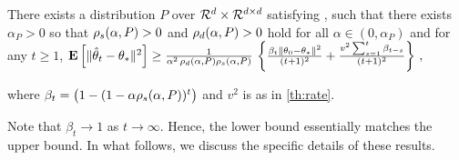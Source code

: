 \begin{theorem}\label{th:lb}
There exists a distribution $P$ over $\mathcal{R}^d\times \mathcal{R}^{d \times d}$ satisfying , such that
there exists $\alpha_P>0$ so that $\rho_s(\alpha,P)>0$ and $\rho_d(\alpha,P)>0$ hold for all $\alpha\in (0,\alpha_P)$ and
for any $t\ge 1$,  $\mathbf{E}\left[\| \hat{\theta}_t-\theta_*\|^2\right] 
\geq \frac{1}{\alpha^2 \, \rho_d(\alpha,P)\rho_s(\alpha,P)} \,\left\{ \frac{\beta_t \left\| \theta_0-\theta_*\right\|^2}{(t+1)^2} 
+ \frac{v^2\sum_{s=1}^t \beta_{t-s}  }{(t+1)^2} \right\}\,,$
\begin{comment}
\begin{align*}
\EE{\normsm{\thh_t-\ts}^2} 
&\geq \frac{1}{\alpha^2 \, \rhod{P}\rhos{P}} \,\left\{ \frac{\beta_t \norm{\theta_0-\ts}^2}{(t+1)^2} 
+ \frac{v^2\sum_{s=1}^t \beta_{t-s}  }{(t+1)^2} \right\}\,,
\end{align*}
\end{comment}
where $\beta_{t} =  \big(1-(1-\alpha \rho_s(\alpha,P))^t\big)$ and $v^2$ is as in \cref{th:rate}.
\begin{comment}
\begin{align}
\frac{1}{(t+1)^2}(\alpha \lambda_{\min})^{-2}(1-\alpha \lambda_{\min}^t) \theta^2_0(1)\leq \norm{\eh_t}^2\leq
\frac{1}{(t+1)^2} \left(\alpha^{-1}\rhos{P^0}+\alpha^{-2}\rhos{P^0}^2\right)\norm{\theta_0}^2
\end{align}
\end{comment}
\end{theorem}
Note that $\beta_t \to 1$ as $t\to\infty$. Hence, the lower bound essentially matches the upper bound.
In what follows, we discuss the specific details of these results. 

